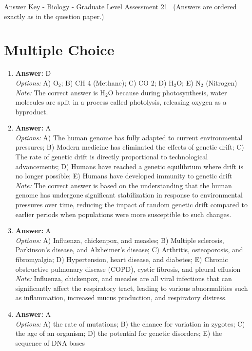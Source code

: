 \documentclass[12pt]{article}
\begin{document}
\begin{center}
Answer Key - Biology - Graduate Level Assessment 21 \
\small (Answers are ordered exactly as in the question paper.)
\end{center}

\section*{Multiple Choice}
\begin{enumerate}[label=\arabic*.]
\item \textbf{Answer:} D
\\ \textit{Options:} A) O$_{2}$; B) CH 4 (Methane); C) CO 2; D) H$_{2}$O; E) N$_{2}$ (Nitrogen)
\\ \textit{Note:} The correct answer is H$_{2}$O because during photosynthesis, water molecules are split in a process called photolysis, releasing oxygen as a byproduct.
\item \textbf{Answer:} A
\\ \textit{Options:} A) The human genome has fully adapted to current environmental pressures; B) Modern medicine has eliminated the effects of genetic drift; C) The rate of genetic drift is directly proportional to technological advancements; D) Humans have reached a genetic equilibrium where drift is no longer possible; E) Humans have developed immunity to genetic drift
\\ \textit{Note:} The correct answer is based on the understanding that the human genome has undergone significant stabilization in response to environmental pressures over time, reducing the impact of random genetic drift compared to earlier periods when populations were more susceptible to such changes.
\item \textbf{Answer:} A
\\ \textit{Options:} A) Influenza, chickenpox, and measles; B) Multiple sclerosis, Parkinson's disease, and Alzheimer's disease; C) Arthritis, osteoporosis, and fibromyalgia; D) Hypertension, heart disease, and diabetes; E) Chronic obstructive pulmonary disease (COPD), cystic fibrosis, and pleural effusion
\\ \textit{Note:} Influenza, chickenpox, and measles are all viral infections that can significantly affect the respiratory tract, leading to various abnormalities such as inflammation, increased mucus production, and respiratory distress.
\item \textbf{Answer:} A
\\ \textit{Options:} A) the rate of mutations; B) the chance for variation in zygotes; C) the age of an organism; D) the potential for genetic disorders; E) the sequence of DNA bases

\end{enumerate}
\end{document}
